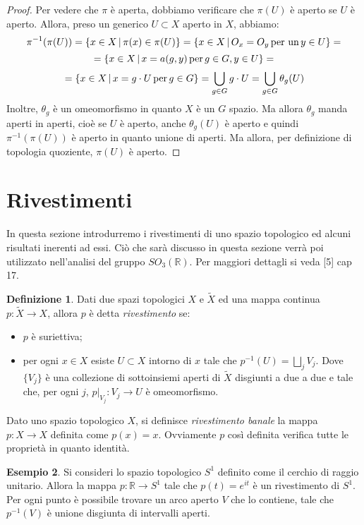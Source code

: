 \documentclass[12pt,a4paper]{report}
\theoremstyle{definition}
\newtheorem{Def}{Definizione}[chapter]
\theoremstyle{Theorem}
\theoremstyle{definition}
\newtheorem{Ex}[Def]{Esempio}
\theoremstyle{definition}
\theoremstyle{definition}
\begin{document}
\begin{proof}
	Per vedere che $\pi$ è aperta, dobbiamo verificare che $\pi(U)$ è aperto se $U$ è aperto. Allora, preso un generico $U\subset X$ aperto in $X$, abbiamo:
	$$\pi^{-1}(\pi(U))=\{x\in X \,|\, \pi(x)\in \pi(U)\}=\{x\in X \,|\, O_x=O_y \,\hbox{per un} \, y\in U\}=$$
	$$=\{x\in X \, | \, x=a(g,y) \, \hbox{per} \, g\in G, y\in U\}=$$
	$$=\{x\in X \, | \, x=g\cdot U \, \hbox{per} \, g\in G\}= \bigcup_{g\in G} g\cdot U=\bigcup_{g\in G}\theta_g(U)$$
	Inoltre, $\theta_g$ è un omeomorfismo in quanto $X$ è un $G$ spazio. Ma allora $\theta_g$ manda aperti in aperti, cioè se $U$ è aperto, anche $\theta_g(U)$ è aperto e quindi $\pi^{-1}(\pi(U))$ è aperto in quanto unione di aperti. Ma allora, per definizione di topologia quoziente, $\pi(U)$ è aperto.
\end{proof}
\section{Rivestimenti}
In questa sezione introdurremo i rivestimenti di uno spazio topologico ed alcuni risultati inerenti ad essi. Ciò che sarà discusso in questa sezione verrà poi utilizzato nell'analisi del gruppo $SO_3(\mathbb{R})$. Per maggiori dettagli si veda [5] cap 17.
\begin{Def}
	Dati due spazi topologici $X$ e $\tilde{X}$ ed una mappa continua $p:\tilde{X}\rightarrow X$, allora $p$ è detta \textit{rivestimento} se:
	\begin{itemize}
		\item $p$ è suriettiva;
		\item per ogni $x\in X$ esiste $U\subset X$ intorno di $x$ tale che $p^{-1}(U)=\bigsqcup_j V_j$. Dove $\{V_j\}$ è una collezione di sottoinsiemi aperti di $\tilde{X}$ disgiunti a due a due e tale che, per ogni $j$, $p\rvert_{V_j}:V_j\rightarrow U$ è omeomorfismo. 
	\end{itemize}
\end{Def}
	Dato uno spazio topologico $X$, si definisce \textit{rivestimento banale} la mappa $p:X\rightarrow X$ definita come $p(x)=x$. Ovviamente $p$ così definita verifica tutte le proprietà in quanto identità.
\begin{Ex}
	Si consideri lo spazio topologico $S^1$ definito come il cerchio di raggio unitario. Allora la mappa $p:\mathbb{R}\rightarrow S^1$ tale che $p(t)=e^{it}$ è un rivestimento di $S^1$. Per ogni punto è possibile trovare un arco aperto $V$ che lo contiene, tale che $p^{-1}(V)$ è unione disgiunta di intervalli aperti.
\end{Ex}
\end{document}
